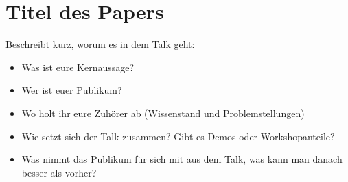\documentclass[a4paper,11pt]{scrartcl}
\begin{document}


\parindent0pt
\parskip10pt

\section*{\textcolor{b1blau}{Titel des Papers}}

Beschreibt kurz, worum es in dem Talk geht:
\begin{itemize}
\item Was ist eure Kernaussage?
\item Wer ist euer Publikum?
\item Wo holt ihr eure Zuhörer ab (Wissenstand und Problemstellungen)
\item Wie setzt sich der Talk zusammen? Gibt es Demos oder Workshopanteile?
\item Was nimmt das Publikum für sich mit aus dem Talk, was kann man danach besser als vorher?
\end{itemize}
\end{document}
